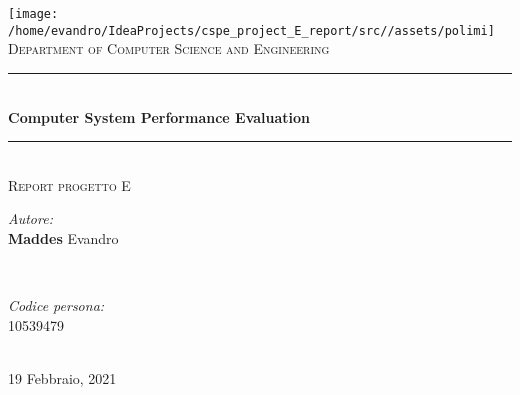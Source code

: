 \documentclass[a4paper, hidelinks, 12pt]{report}
\begin{document}
    \begin{titlepage}
        \centering
        \vspace*{0.7 cm}
        \texttt{[image: /home/evandro/IdeaProjects/cspe\_project\_E\_report/src//assets/polimi]}\\[1.6 cm]
        \textsc{\large Department of Computer Science and Engineering}\\[1.8 cm]

        \rule{\linewidth}{0.2 mm} \\[0.4 cm]
        { \huge \bfseries Computer System Performance Evaluation }\\
        \rule{\linewidth}{0.2 mm} \\[1.5 cm]

        \textsc{\Large Report progetto E}\\[0.5 cm]

        \begin{minipage}{0.4\textwidth}
            \begin{flushleft} \large
            \emph{Autore:}\\
            \textbf{Maddes} Evandro \\
            \end{flushleft}
        \end{minipage}~
        \begin{minipage}{0.4\textwidth}
            \begin{flushright} \large
            \emph{Codice persona:} \\
            10539479 \\
            \end{flushright}
        \end{minipage}\\[2 cm]

        {\large 19 Febbraio, 2021}\\[2 cm]

        \vfill
    \end{titlepage}

    \tableofcontents
    \newpage
    \listoftables
    \newpage
    \listoffigures
    \clearpage
    \setcounter{page}{1}
%
    \newpage
    
    
    
    
    
\end{document}
